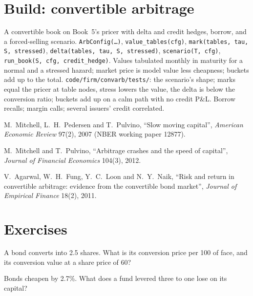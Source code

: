 \section{Build: convertible arbitrage}\label{bld:s2:convertible-arbitrage:convarb}

\begin{build}
 A convertible book on Book~5's pricer with delta and credit hedges, borrow, and a forced-selling scenario.
 \texttt{ArbConfig(\dots)}, \texttt{value\_tables(cfg)}, \texttt{mark(tables, tau, S, stressed)}, \texttt{delta(tables, tau, S,
stressed)}, \texttt{scenario(T, cfg)}, \texttt{run\_book(S, cfg, credit\_hedge)}.
 Values tabulated monthly in maturity for a normal and a stressed hazard; market price is model value less cheapness; buckets add up
to the total.
 \texttt{code/firm/convarb/tests/}: the scenario's shape; marks equal the pricer at table nodes, stress lowers the value,
the delta is below the conversion ratio; buckets add up on a calm path with no credit P\&L.
 Borrow recalls; margin calls; several issuers' credit correlated.
\end{build}

\begin{omsources}
\item M.~Mitchell, L.~H.~Pedersen and T.~Pulvino, ``Slow moving capital'', \emph{American Economic Review} 97(2), 2007 (NBER working paper 12877).
\item M.~Mitchell and T.~Pulvino, ``Arbitrage crashes and the speed of capital'', \emph{Journal of Financial Economics} 104(3), 2012.
\item V.~Agarwal, W.~H.~Fung, Y.~C.~Loon and N.~Y.~Naik, ``Risk and return in convertible arbitrage: evidence from the convertible bond market'',
\emph{Journal of Empirical Finance} 18(2), 2011.
\end{omsources}

\section{Exercises}

\begin{exercise}[$\star$]\label{exo:s2:convertible-arbitrage:1}
A bond converts into 2.5 shares. What is its conversion price per 100 of face, and its conversion value at a share price of 60?
\end{exercise}

\begin{exercise}[$\star$]\label{exo:s2:convertible-arbitrage:2}
Bonds cheapen by 2.7\%. What does a fund levered three to one lose on its capital?
\end{exercise}

